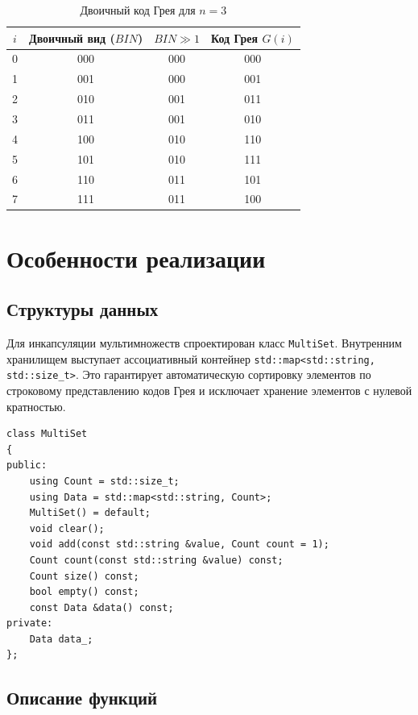 \documentclass[14pt]{extreport}
\begin{document}
\begin{table}[H]
\centering
\caption{Двоичный код Грея для $n=3$}
\label{tab1}
\begin{tabular}{|c|c|c|c|}
\hline
$i$ & Двоичный вид ($BIN$) & $BIN \gg 1$ & Код Грея $G(i)$ \\ \hline
0 & 000 & 000 & 000 \\ \hline
1 & 001 & 000 & 001 \\ \hline
2 & 010 & 001 & 011 \\ \hline
3 & 011 & 001 & 010 \\ \hline
4 & 100 & 010 & 110 \\ \hline
5 & 101 & 010 & 111 \\ \hline
6 & 110 & 011 & 101 \\ \hline
7 & 111 & 011 & 100 \\ \hline
\end{tabular}
\end{table}

\newpage
{\centering\section{Особенности реализации}}

{\subsection{Структуры данных}}
Для инкапсуляции мультимножеств спроектирован класс \texttt{MultiSet}. Внутренним хранилищем выступает ассоциативный контейнер \texttt{std::map<std::string, std::size\_t>}. Это гарантирует автоматическую сортировку элементов по строковому представлению кодов Грея и исключает хранение элементов с нулевой кратностью.

\begin{lstlisting}[caption={Класс мультимножества \texttt{MultiSet}}, label={lst:multiset}]
class MultiSet
{
public:
    using Count = std::size_t;
    using Data = std::map<std::string, Count>;
    MultiSet() = default;
    void clear();
    void add(const std::string &value, Count count = 1);
    Count count(const std::string &value) const;
    Count size() const;
    bool empty() const;
    const Data &data() const;
private:
    Data data_;
};
\end{lstlisting}

{\subsection{Описание функций}}
\end{document}
